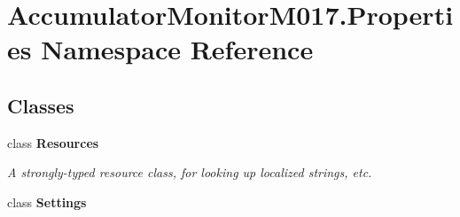 \hypertarget{namespace_accumulator_monitor_m017_1_1_properties}{}\section{Accumulator\+Monitor\+M017.\+Properties Namespace Reference}
\label{namespace_accumulator_monitor_m017_1_1_properties}
\subsection*{Classes}
\begin{DoxyCompactItemize}
\item 
class {\bfseries Resources}
\begin{DoxyCompactList}\small\item\em A strongly-\/typed resource class, for looking up localized strings, etc. \end{DoxyCompactList}\item 
class {\bfseries Settings}
\end{DoxyCompactItemize}
